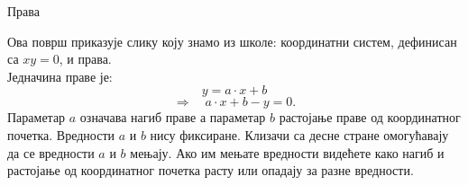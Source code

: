 \documentclass[sr]{./../../common/SurferDesc}%
\begin{document}
\footnotesize
%
 
\begin{surferPage}
  \begin{surferTitle}Права\end{surferTitle}
   \begin{surferText}
   
Ова површ приказује слику коју знамо из школе: координатни систем, дефинисан са $xy=0$, и права. \\Једначина праве је:
\[y=a\cdot x + b\]
\[ \Rightarrow \quad a\cdot x +b -y=0.\]
Параметар  $a$ означава нагиб праве а параметар  $b$ растојање праве од координатног почетка.
\newline \newline
Вредности  $a$ и $b$ нису фиксиране. Клизачи са десне стране омогућавају да се вредности $a$ и $b$ мењају. Ако им мењате вредности видећете како нагиб и растојање од координатног почетка расту или опадају за разне вредности.

     \end{surferText}
\end{surferPage}
\end{document}
